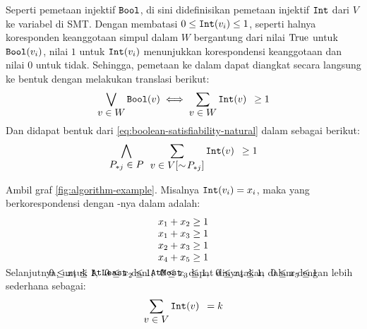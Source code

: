 Seperti pemetaan injektif \(\mathtt{Bool}\), di sini didefinisikan pemetaan injektif \(\mathtt{Int}\) dari \(V\) ke variabel  di SMT. Dengan membatasi \(0 \leq \mathtt{Int}(v_i) \leq 1\), seperti halnya koresponden keanggotaan simpul dalam \(W\) bergantung dari nilai \(\mathrm{True}\) untuk \(\mathtt{Bool}(v_i)\), nilai \(1\) untuk \(\mathtt{Int}(v_i)\) menunjukkan korespondensi keanggotaan dan nilai \(0\) untuk tidak. Sehingga, pemetaan  ke dalam  dapat diangkat secara langsung ke bentuk  dengan melakukan translasi berikut:
\[
	\bigvee \limits_{\displaystyle v \in W} \mathtt{Bool}(v)
	\iff
	\sum \limits_{\displaystyle v \in W} \mathtt{Int}(v) \enspace \geq 1
\]
Dan didapat bentuk dari \autoref{eq:boolean-satisfiability-natural} dalam  sebagai berikut:
\begin{equation}
	\bigwedge \limits_{\displaystyle P_{*j} \in P} \enspace \sum \limits_{\displaystyle v \in V[\sim\!P_{*j}]} \mathtt{Int}(v) \enspace \geq 1
	\label{eq:linear-integer-arithmetic-natural}
\end{equation}

\begin{example}
	Ambil graf \autoref{fig:algorithm-example}. Misalnya \(\mathtt{Int}(v_i) = x_i\), maka  yang berkorespondensi dengan -nya dalam  adalah:
	\[
		\smash[b]{
		\begin{array}{c}
			x_1 + x_2 \geq 1 \\
			x_1 + x_3 \geq 1 \\
			x_2 + x_3 \geq 1 \\
			x_4 + x_5 \geq 1 \\ [4pt]
			0 \leq x_1 \leq 1,\enspace
			0 \leq x_2 \leq 1,\enspace
			0 \leq x_3 \leq 1,\enspace
			0 \leq x_4 \leq 1,\enspace
			0 \leq x_5 \leq 1
		\end{array}
		} \vspace{0.75em}
	\]
\end{example}

Selanjutnya, untuk  \(\mathtt{AtLeast}\) dan \(\mathtt{AtMost}\), dapat dinyatakan dalam  dengan lebih sederhana sebagai:
\begin{equation}
	\sum \limits_{\displaystyle v \in V} \mathtt{Int}(v) \enspace = k
	\label{eq:linear-integer-arithmetic-cardinality}
\end{equation}

\vspace{-0.5em}

